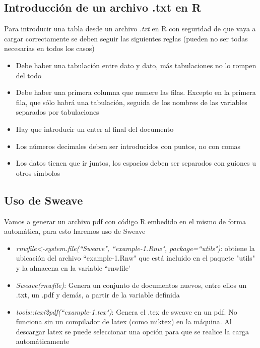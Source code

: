\documentclass[a4paper, 12pt]{article}
\begin{document}
    \newpage
    
    \subsection{Introducción de un archivo .txt en R}
        Para introducir una tabla desde un archivo \emph{.txt} en R con seguridad de que vaya a cargar correctamente se deben seguir las siguientes reglas (pueden no ser todas necesarias en todos los casos)
        
        \begin{itemize}
            \item Debe haber una tabulación entre dato y dato, más tabulaciones no lo rompen del todo
            
            \item Debe haber una primera columna que numere las filas. Excepto en la primera fila, que sólo habrá una tabulación, seguida de los nombres de las variables separados por tabulaciones
            
            \item Hay que introducir un enter al final del documento
            
            \item Los números decimales deben ser introducidos con puntos, no con comas
            
            \item Los datos tienen que ir juntos, los espacios deben ser separados con guiones u otros símbolos
        \end{itemize}
        

    \subsection{Uso de Sweave}
        Vamos a generar un archivo pdf con código R embedido en el mismo de forma automática, para esto haremos uso de Sweave
        \begin{itemize}
            \item \emph{rnwfile<-system.file(\textquotedblleft Sweave", \textquotedblleft example-1.Rnw", package=\textquotedblleft utils")}: obtiene la ubicación del archivo \textquotedblleft example-1.Rnw" que está incluido en el paquete "utils" y la almacena en la variable \textquotedblleft rnwfile'

            \item \emph{Sweave(rnwfile)}: Genera un conjunto de documentos nuevos, entre ellos un .txt, un .pdf y demás, a partir de la variable definida

            \item \emph{tools::texi2pdf(\textquotedblleft example-1.tex")}: Genera el .tex de sweave en un pdf. No funciona sin un compilador de latex (como miktex) en la máquina. Al descargar latex se puede seleccionar una opción para que se realice la carga automáticamente
        \end{itemize}
\end{document}
